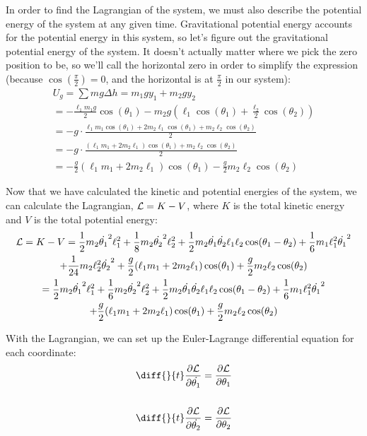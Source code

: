 \documentclass[]{article}
\begin{document}
In order to find the Lagrangian of the system, we must also describe the potential energy of the system at any given time. Gravitational potential energy accounts for the potential energy in this system, so let's figure out the gravitational potential energy of the system. It doesn't actually matter where we pick the zero position to be, so we'll call the horizontal zero in order to simplify the expression (because $\cos(\frac{\pi}{2}) = 0$, and the horizontal is at $\frac{\pi}{2}$ in our system):
\begin{gather*}
	U_g = \sum mg\Delta h = m_1gy_1 + m_2gy_2 \\
	= -\frac{\ell_1m_1g}{2}\cos(\theta_1) - m_2g(\ell_1\cos(\theta_1) + \frac{\ell_2}{2}\cos(\theta_2)) \\
	= -g\cdot\frac{\ell_1m_1\cos(\theta_1) + 2m_2\ell_1\cos(\theta_1) + m_2\ell_2\cos(\theta_2)}{2} \\
	= -g\cdot\frac{(\ell_1m_1 + 2m_2\ell_1)\cos(\theta_1) + m_2\ell_2\cos(\theta_2)}{2} \\
	= -\frac{g}{2}(\ell_1m_1 + 2m_2\ell_1)\cos(\theta_1) - \frac{g}{2}m_2\ell_2\cos(\theta_2)
\end{gather*}

Now that we have calculated the kinetic and potential energies of the system, we can calculate the Lagrangian, $\mathcal{L} = K - V$, where $K$ is the total kinetic energy and $V$ is the total potential energy:
\begin{gather*}
	\mathcal{L} = K - V = \frac12m_2\dot{\theta_1}^2\ell_1^2 + \frac18m_2\dot{\theta_2}^2\ell_2^2 + \frac12m_2\dot{\theta_1}\dot{\theta_2}\ell_1\ell_2\cos(\theta_1 - \theta_2) + \frac16m_1\ell_1^2\dot{\theta_1}^2 \\ + \frac{1}{24}m_2\ell_2^2\dot{\theta_2}^2 + \frac{g}{2}(\ell_1m_1 + 2m_2\ell_1)\cos(\theta_1) + \frac{g}{2}m_2\ell_2\cos(\theta_2) \\
	= \frac12m_2\dot{\theta_1}^2\ell_1^2 + \frac16m_2\dot{\theta_2}^2\ell_2^2 + \frac12m_2\dot{\theta_1}\dot{\theta_2}\ell_1\ell_2\cos(\theta_1 - \theta_2) + \frac16m_1\ell_1^2\dot{\theta_1}^2 \\ + \frac{g}{2}(\ell_1m_1 + 2m_2\ell_1)\cos(\theta_1) + \frac{g}{2}m_2\ell_2\cos(\theta_2)
\end{gather*}

With the Lagrangian, we can set up the Euler-Lagrange differential equation for each coordinate:
\begin{gather*}
	\diff{}{t}\frac{\partial \lagr}{\partial \dot{\theta_1}} = \frac{\partial \lagr}{\partial \theta_1} \\ \\
	\diff{}{t}\frac{\partial \lagr}{\partial \dot{\theta_2}} = \frac{\partial \lagr}{\partial \theta_2}
\end{gather*}
\end{document}
